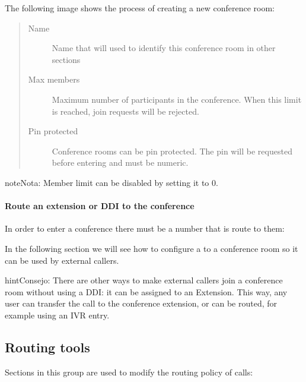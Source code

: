 \documentclass[letterpaper,10pt,spanish]{sphinxmanual}
\begin{document}
The following image shows the process of creating a new conference room:
\begin{quote}
\begin{description}
\item[{Name}] \leavevmode
Name that will used to identify this conference room in other sections

\item[{Max members}] \leavevmode
Maximum number of participants in the conference. When this limit is
reached, join requests will be rejected.

\item[{Pin protected}] \leavevmode
Conference rooms can be pin protected. The pin will be requested before
entering and must be numeric.

\end{description}
\end{quote}

\begin{notice}{note}{Nota:}
Member limit can be disabled by setting it to 0.
\end{notice}
\paragraph{Route an extension or DDI to the conference}

In order to enter a conference there must be a number that is route to them:

In the following section we will see how to configure a {\hyperref[administration_portal/brand/views/ddis:ddis]{}} to a conference room so it can be used by external callers.

\begin{notice}{hint}{Consejo:}
There are other ways to make external callers join a conference room
without using a DDI: it can be assigned to an Extension. This way, any user
can transfer the call to the conference extension, or can be routed, for
example using an IVR entry.
\end{notice}


\subsection{Routing tools}
\label{administration_portal/client/vpbx/routing_tools/index::doc}\label{administration_portal/client/vpbx/routing_tools/index:routing-tools}
Sections in this group are used to modify the routing policy of calls:
\label{administration_portal/client/vpbx/routing_tools/external_call_filters:external-filters}
\end{document}
